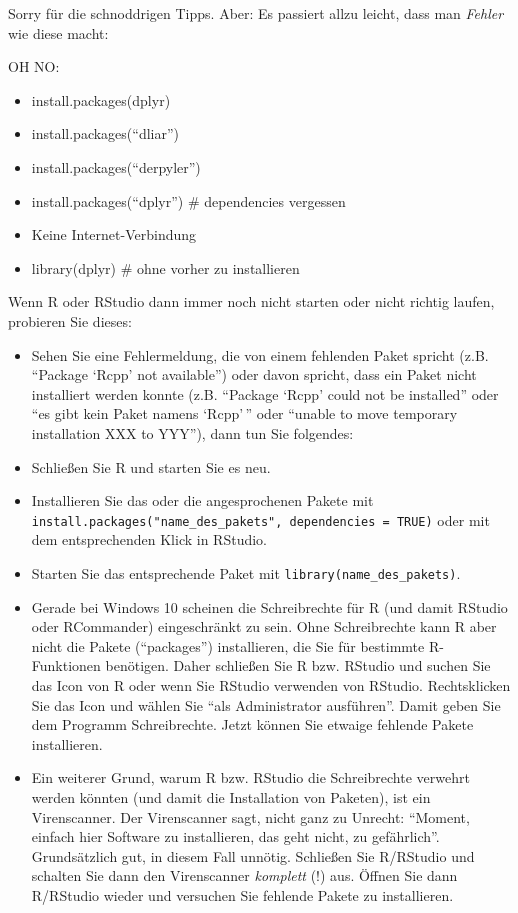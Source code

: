 \documentclass[12pt,ngerman,]{book}
\let\BeginKnitrBlock\begin \let\EndKnitrBlock\end
\begin{document}
Sorry für die schnoddrigen Tipps. Aber: Es passiert allzu leicht, dass
man \emph{Fehler} wie diese macht:

\BeginKnitrBlock{rmdcaution}
OH NO:

\begin{itemize}
\item
  install.packages(dplyr)
\item
  install.packages(``dliar'')
\item
  install.packages(``derpyler'')
\item
  install.packages(``dplyr'') \# dependencies vergessen
\item
  Keine Internet-Verbindung
\item
  library(dplyr) \# ohne vorher zu installieren
\end{itemize}
\EndKnitrBlock{rmdcaution}

Wenn R oder RStudio dann immer noch nicht starten oder nicht richtig
laufen, probieren Sie dieses:

\begin{itemize}
\item
  Sehen Sie eine Fehlermeldung, die von einem fehlenden Paket spricht
  (z.B. ``Package `Rcpp' not available'') oder davon spricht, dass ein
  Paket nicht installiert werden konnte (z.B. ``Package `Rcpp' could not
  be installed'' oder ``es gibt kein Paket namens `Rcpp'\,'' oder
  ``unable to move temporary installation XXX to YYY''), dann tun Sie
  folgendes:
\item
  Schließen Sie R und starten Sie es neu.
\item
  Installieren Sie das oder die angesprochenen Pakete mit
  \texttt{install.packages("name\_des\_pakets",\ dependencies\ =\ TRUE)}
  oder mit dem entsprechenden Klick in RStudio.
\item
  Starten Sie das entsprechende Paket mit
  \texttt{library(name\_des\_pakets)}.
\item
  Gerade bei Windows 10 scheinen die Schreibrechte für R (und damit
  RStudio oder RCommander) eingeschränkt zu sein. Ohne Schreibrechte
  kann R aber nicht die Pakete (``packages'') installieren, die Sie für
  bestimmte R-Funktionen benötigen. Daher schließen Sie R bzw. RStudio
  und suchen Sie das Icon von R oder wenn Sie RStudio verwenden von
  RStudio. Rechtsklicken Sie das Icon und wählen Sie ``als Administrator
  ausführen''. Damit geben Sie dem Programm Schreibrechte. Jetzt können
  Sie etwaige fehlende Pakete installieren.
\item
  Ein weiterer Grund, warum R bzw. RStudio die Schreibrechte verwehrt
  werden könnten (und damit die Installation von Paketen), ist ein
  Virenscanner. Der Virenscanner sagt, nicht ganz zu Unrecht: ``Moment,
  einfach hier Software zu installieren, das geht nicht, zu
  gefährlich''. Grundsätzlich gut, in diesem Fall unnötig. Schließen Sie
  R/RStudio und schalten Sie dann den Virenscanner \emph{komplett} (!)
  aus. Öffnen Sie dann R/RStudio wieder und versuchen Sie fehlende
  Pakete zu installieren.
\end{itemize}
\end{document}
